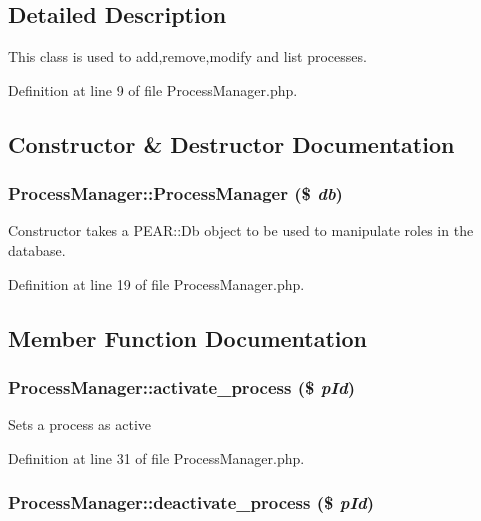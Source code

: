 \subsection{Detailed Description}
This class is used to add,remove,modify and list processes. 



Definition at line 9 of file Process\-Manager.php.

\subsection{Constructor \& Destructor Documentation}
\subsubsection{\setlength{\rightskip}{0pt plus 5cm}Process\-Manager::Process\-Manager (\$ {\em db})}\label{classProcessManager_a0}


Constructor takes a PEAR::Db object to be used to manipulate roles in the database. 

Definition at line 19 of file Process\-Manager.php.

\subsection{Member Function Documentation}
\subsubsection{\setlength{\rightskip}{0pt plus 5cm}Process\-Manager::activate\_\-process (\$ {\em p\-Id})}\label{classProcessManager_a1}


Sets a process as active 

Definition at line 31 of file Process\-Manager.php.
\subsubsection{\setlength{\rightskip}{0pt plus 5cm}Process\-Manager::deactivate\_\-process (\$ {\em p\-Id})}\label{classProcessManager_a2}


